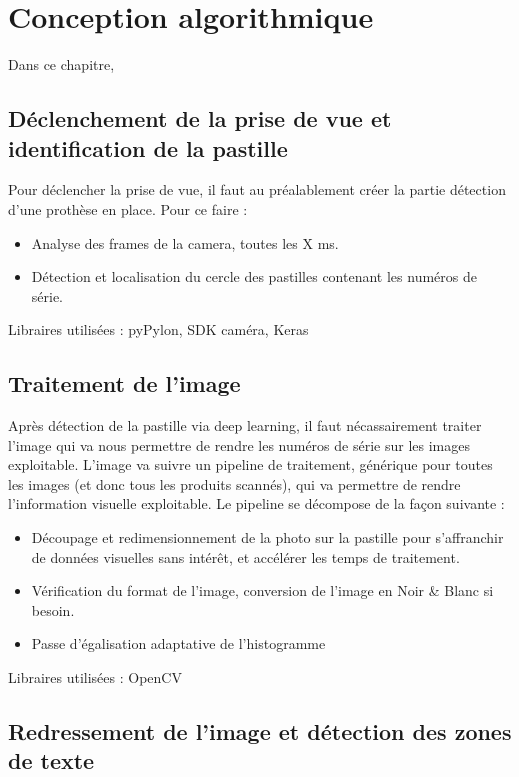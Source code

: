 \chapter{Conception algorithmique}

Dans ce chapitre,

\section{Déclenchement de la prise de vue et identification de la pastille}

Pour déclencher la prise de vue, il faut au préalablement créer la partie détection d’une prothèse en place.
Pour ce faire :
\begin{itemize}
    \item Analyse des frames de la camera, toutes les X ms.
    \item Détection et localisation du cercle des pastilles contenant les numéros de série.
\end{itemize}
Libraires utilisées : pyPylon, SDK caméra, Keras

\section{Traitement de l’image}

Après détection de la pastille via deep learning, il faut nécassairement traiter l'image qui va nous permettre de rendre les numéros de série sur les images exploitable. L’image va suivre un pipeline de traitement, générique pour toutes les images (et donc tous les produits scannés), qui va permettre de rendre l’information visuelle exploitable.
Le pipeline se décompose de la façon suivante :
\begin{itemize}
    \item Découpage et redimensionnement de la photo sur la pastille pour s’affranchir de données visuelles sans intérêt, et accélérer les temps de traitement.
    \item Vérification du format de l'image, conversion de l’image en Noir & Blanc si besoin.
    \item Passe d’égalisation adaptative de l’histogramme
\end{itemize}

Libraires utilisées : OpenCV

\section{Redressement de l'image et détection des zones de texte}

